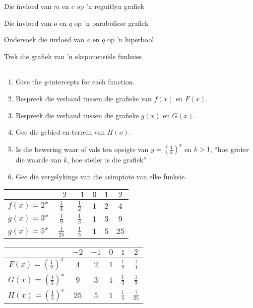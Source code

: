 \begin{Ondersoek}{Die invloed van $m$ en $c$ op 'n reguitlyn grafiek}
\begin{Ondersoek}{Die invloed van $a$ en $q$ op 'n paraboliese grafiek}
\begin{Ondersoek}{Ondersoek die invloed van $a$ en $q$ op 'n hiperbool}
\begin{wex}{Trek die grafiek van 'n eksponensiële funksies}
{\begin{table}[H]
\begin{center}
\begin{tabular}{|c|c|c|c|c|c|}
\end{tabular}
\end{center}
\end{table}

\begin{enumerate}[noitemsep, label=\textbf{\arabic*}. ] 
 \item Give the $y$-intercepts for each function.
\item Bespreek die verband tussen die grafieke van $f(x)$ en $F(x)$.
\item Bespreek die verband tussen die grafieke $g(x)$ en $G(x)$.
\item Gee die gebied en terrein van $H(x)$.
\item Is die bewering waar of vals ten opsigte van $y=(\frac{1}{k})^{x}$ en $k>1$, ``hoe groter die waarde van $k$, hoe steiler is die grafiek''
\item Gee die vergelykings van die asimptote van elke funksie.
\end{enumerate}

}
{
\begin{table}[H]
\begin{center}
\begin{tabular}{|c|c|c|c|c|c|}
\hline
   &  $-2$ & $-1$ & $0$ & $1$ & $2$ 
\\ \hline
 $f(x)=2^{x}$& $\frac{1}{4}$ &$\frac{1}{2}$&$1$&$2$&$4$
\\ \hline
 $g(x)=3^{x}$& $\frac{1}{9}$ &$\frac{1}{3}$&$1$&$3$&$9$
\\ \hline
 $g(x)=5^{x}$& $\frac{1}{25}$ &$\frac{1}{5}$&$1$&$5$&$25$
\\ \hline

\end{tabular}
\end{center}
\end{table}

\begin{table}[H]
\begin{center}
\begin{tabular}{|c|c|c|c|c|c|}
\hline
   &  $-2$ & $-1$ & $0$ & $1$ & $2$ 
\\ \hline
 $F(x)=(\frac{1}{2})^{x}$& $4$ &$2$&$1$&$\frac{1}{2}$&$\frac{1}{4}$
\\ \hline
$G(x)=(\frac{1}{3})^{x}$&  $9$&$3$&$1$&$\frac{1}{3}$&$\frac{1}{9}$
\\ \hline
$H(x)=(\frac{1}{5})^{x}$& $25$& $5$&$1$&$\frac{1}{5}$&$\frac{1}{25}$
\\ \hline


\end{tabular}
\end{center}
\end{table}}
\end{wex}
\end{Ondersoek}
\end{Ondersoek}
\end{Ondersoek}
